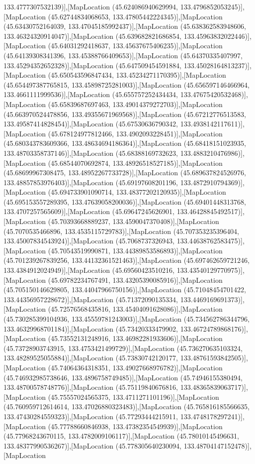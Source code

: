 133.4777307532139)],[MapLocation (45.624086940629994, 133.4796852053245)],[MapLocation (45.62744834068653, 133.47805442224345)],[MapLocation (45.63430752164039, 133.47045185992437)],[MapLocation (45.638362583948606, 133.46324320914047)],[MapLocation (45.639682821686854, 133.45963832022446)],[MapLocation (45.64031292418637, 133.45637675406235)],[MapLocation (45.64139308341396, 133.45388766409653)],[MapLocation (45.64370335407997, 133.45294352652328)],[MapLocation (45.647509454591884, 133.45028164813237)],[MapLocation (45.650543596847434, 133.45234271170395)],[MapLocation (45.654497387765815, 133.45898725281003)],[MapLocation (45.656597146466964, 133.4661111999536)],[MapLocation (45.655757252434434, 133.47675420532468)],[MapLocation (45.65839687697463, 133.49014379272703)],[MapLocation (45.663970524478856, 133.49355671969568)],[MapLocation (45.67212776513583, 133.49587414828454)],[MapLocation (45.67530636790342, 133.4938142117611)],[MapLocation (45.678124977812466, 133.4902093228451)],[MapLocation (45.680343783609366, 133.48634694186364)],[MapLocation (45.68418151023935, 133.48703358737146)],[MapLocation (45.68388169732623, 133.4883210476986)],[MapLocation (45.68544070692874, 133.48926518527185)],[MapLocation (45.68699967308475, 133.48952267733728)],[MapLocation (45.689637824526976, 133.48857853976403)],[MapLocation (45.69197608201196, 133.4872910794369)],[MapLocation (45.694733901090714, 133.48377202120935)],[MapLocation (45.695153557289395, 133.47639058200036)],[MapLocation (45.69401448313768, 133.4707257565609)],[MapLocation (45.69647245626901, 133.46428845492517)],[MapLocation (45.70393668889237, 133.4590047370408)],[MapLocation (45.7070535466896, 133.4535115729783)],[MapLocation (45.707353235396404, 133.45007834543924)],[MapLocation (45.7068737326943, 133.44638762583475)],[MapLocation (45.70543519990871, 133.44389853586893)],[MapLocation (45.701239267839256, 133.44132361521463)],[MapLocation (45.697462659721246, 133.4384912024949)],[MapLocation (45.69560423510216, 133.43540129770975)],[MapLocation (45.69782234767491, 133.43205390085916)],[MapLocation (45.705150146629805, 133.44047966750156)],[MapLocation (45.71048454701422, 133.44356957228672)],[MapLocation (45.71372090135334, 133.4469169691373)],[MapLocation (45.72576568435816, 133.45404091628086)],[MapLocation (45.730285399104936, 133.45559781243003)],[MapLocation (45.734562786344796, 133.46329968701184)],[MapLocation (45.73420333479902, 133.46724789868176)],[MapLocation (45.73552131248916, 133.46982281933606)],[MapLocation (45.73728903743915, 133.4753421499729)],[MapLocation (45.736270635103324, 133.48289525055884)],[MapLocation (45.73830742120177, 133.48761593842505)],[MapLocation (45.74064364318351, 133.49027668976782)],[MapLocation (45.746932985738646, 133.4896758749485)],[MapLocation (45.74946155380494, 133.48700578748776)],[MapLocation (45.75119840676816, 133.48365839063717)],[MapLocation (45.75557024565375, 133.4711271101196)],[MapLocation (45.760959712614614, 133.47026880323483)],[MapLocation (45.765816185566635, 133.47430284559323)],[MapLocation (45.77293444215911, 133.4748178297241)],[MapLocation (45.77788660846938, 133.47382354549939)],[MapLocation (45.77968243670115, 133.4782009106117)],[MapLocation (45.78010145496631, 133.48377990536267)],[MapLocation (45.778305640230094, 133.48704147152478)],[MapLocation 